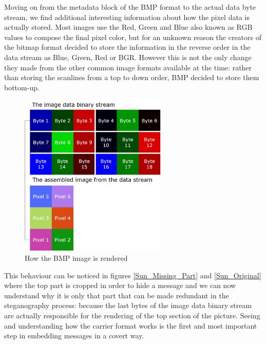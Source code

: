 \begin{multicols}{2}
Moving on from the metadata block of the BMP format to the actual data byte stream, we find additional interesting information about how the pixel data is actually stored. Most images use the Red, Green and Blue also known as RGB values to compose the final pixel color, but for an unknown reason the creators of the bitmap format decided to store the information in the reverse order in the data stream as Blue, Green, Red or BGR. However this is not the only change they made from the other common image formats available at the time: rather than storing the scanlines from a top to down order, BMP decided to store them bottom-up.

\begin{figure}[H]
    \centering
    \includegraphics[width=7cm,keepaspectratio]{pics/assembling_bmp_image}
    \caption{How the BMP image is rendered}
    \label{bmp_how_to_render}
\end{figure}

This behaviour can be noticed in figures \ref{Sun_Missing_Part} and \ref{Sun_Original} where the top part is cropped in order to hide a message and we can now understand why it is only that part that can be made redundant in the steganography process: because the last bytes of the image data binary stream are actually responsible for the rendering of the top section of the picture. Seeing and understanding how the carrier format works is the first and most important step in embedding messages in a covert way.


\end{multicols}
